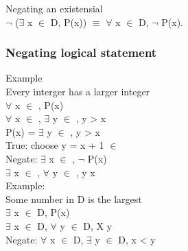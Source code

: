 \documentclass[11pt]{article}
\begin{document}
Negating an existensial\\
\(\neg{}\) (\(\exists\) x \(\in\) D, P(x)) \(\equiv\) \(\forall\) x \(\in\) D, \(\neg{}\) P(x).\\

\subsubsection{Negating logical statement}
\label{sec:orga78dad3}
Example\\
Every interger has a larger integer\\
\(\forall\) x \(\in\) , P(x)\\

\(\forall\) x \(\in\) , \(\exists\) y \(\in\) , y > x\\
P(x) = \(\exists\) y \(\in\) , y > x\\

True: choose y = x + 1 \(\in\) \\

Negate: \(\exists\) x \(\in\) , \(\neg{}\) P(x)\\
\(\exists\) x \(\in\) , \(\forall\) y \(\in\) , y \lteq x\\

Example:\\
Some number in D is the largest\\
\(\exists\) x \(\in\) D, P(x)\\
\(\exists\) x \(\in\) D, \(\forall\) y \(\in\) D, X \grteq y\\

Negate: \(\forall\) x \(\in\) D, \(\exists\) y \(\in\) D, x < y\\
\end{document}
